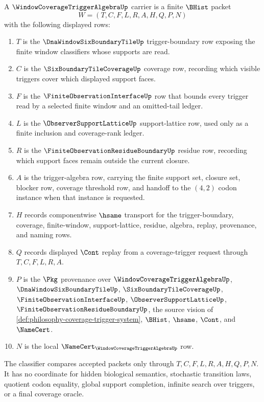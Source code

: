 \begin{definition}
\label{def:window-coverage-trigger-algebra-carrier}
A $\WindowCoverageTriggerAlgebraUp$ carrier is a finite $\BHist$ packet
$$
W=(T,C,F,L,R,A,H,Q,P,N)
$$
with the following displayed rows:
\begin{enumerate}
\item $T$ is the $\DnaWindowSixBoundaryTileUp$ trigger-boundary row exposing the finite window classifiers whose supports are read.
\item $C$ is the $\SixBoundaryTileCoverageUp$ coverage row, recording which visible triggers cover which displayed support faces.
\item $F$ is the $\FiniteObservationInterfaceUp$ row that bounds every trigger read by a selected finite window and an omitted-tail ledger.
\item $L$ is the $\ObserverSupportLatticeUp$ support-lattice row, used only as a finite inclusion and coverage-rank ledger.
\item $R$ is the $\FiniteObservationResidueBoundaryUp$ residue row, recording which support faces remain outside the current closure.
\item $A$ is the trigger-algebra row, carrying the finite support set, closure set, blocker row, coverage threshold row, and handoff to the $(4,2)$ codon instance when that instance is requested.
\item $H$ records componentwise $\hsame$ transport for the trigger-boundary, coverage, finite-window, support-lattice, residue, algebra, replay, provenance, and naming rows.
\item $Q$ records displayed $\Cont$ replay from a coverage-trigger request through $T,C,F,L,R,A$.
\item $P$ is the $\Pkg$ provenance over $\WindowCoverageTriggerAlgebraUp$, $\DnaWindowSixBoundaryTileUp$, $\SixBoundaryTileCoverageUp$, $\FiniteObservationInterfaceUp$, $\ObserverSupportLatticeUp$, $\FiniteObservationResidueBoundaryUp$, the source vision of \autoref{def:philosophy-coverage-trigger-system}, $\BHist$, $\hsame$, $\Cont$, and $\NameCert$.
\item $N$ is the local $\NameCert_{\WindowCoverageTriggerAlgebraUp}$ row.
\end{enumerate}
The classifier compares accepted packets only through $T,C,F,L,R,A,H,Q,P,N$. It has no coordinate for hidden biological semantics, stochastic transition laws, quotient codon equality, global support completion, infinite search over triggers, or a final coverage oracle.
\end{definition}

